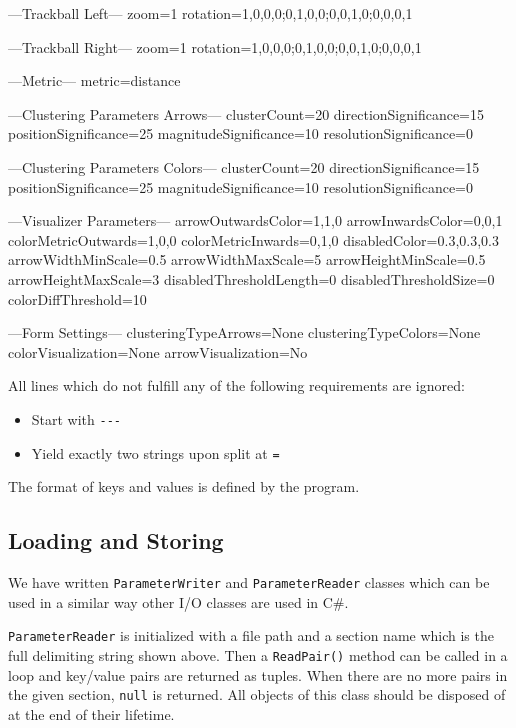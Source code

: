\begin{code}
---Trackball Left---
zoom=1
rotation=1,0,0,0;0,1,0,0;0,0,1,0;0,0,0,1

---Trackball Right---
zoom=1
rotation=1,0,0,0;0,1,0,0;0,0,1,0;0,0,0,1

---Metric---
metric=distance

---Clustering Parameters Arrows---
clusterCount=20
directionSignificance=15
positionSignificance=25
magnitudeSignificance=10
resolutionSignificance=0

---Clustering Parameters Colors---
clusterCount=20
directionSignificance=15
positionSignificance=25
magnitudeSignificance=10
resolutionSignificance=0

---Visualizer Parameters---
arrowOutwardsColor=1,1,0
arrowInwardsColor=0,0,1
colorMetricOutwards=1,0,0
colorMetricInwards=0,1,0
disabledColor=0.3,0.3,0.3
arrowWidthMinScale=0.5
arrowWidthMaxScale=5
arrowHeightMinScale=0.5
arrowHeightMaxScale=3
disabledThresholdLength=0
disabledThresholdSize=0
colorDiffThreshold=10

---Form Settings---
clusteringTypeArrows=None
clusteringTypeColors=None
colorVisualization=None
arrowVisualization=No
\end{code}

All lines which do not fulfill any of the following requirements are ignored:

\begin{itemize}
\item Start with \verb+---+
\item Yield exactly two strings upon split at \verb+=+
\end{itemize}

The format of keys and values is defined by the program.
\subsection{Loading and Storing}

We have written \verb+ParameterWriter+ and \verb+ParameterReader+ classes which can be used in a similar way other I/O classes are used in C\#.

\verb+ParameterReader+ is initialized with a file path and a section name which is the full delimiting string shown above. Then a \verb+ReadPair()+ method can be called in a loop and key/value pairs are returned as tuples. When there are no more pairs in the given section, \verb+null+ is returned. All objects of this class should be disposed of at the end of their lifetime.

